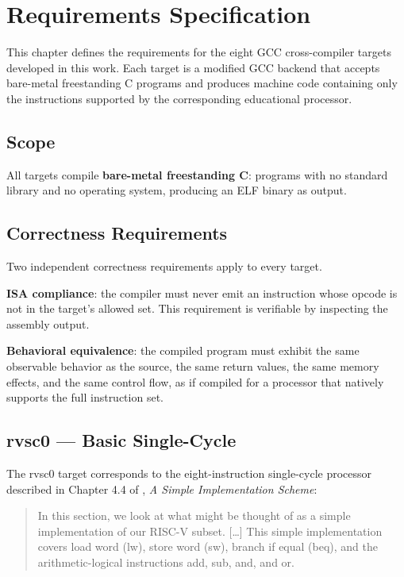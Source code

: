 \chapter{Requirements Specification} \label{cap:requirements}

This chapter defines the requirements for the eight GCC cross-compiler targets developed in this work.
Each target is a modified GCC backend that accepts bare-metal freestanding C programs and produces
machine code containing only the instructions supported by the corresponding educational processor.

\section{Scope}

All targets compile \textbf{bare-metal freestanding C}: programs with no standard library and no
operating system, producing an ELF binary as output.

\section{Correctness Requirements}

Two independent correctness requirements apply to every target.

\textbf{ISA compliance}: the compiler must never emit an instruction whose opcode is not in the
target's allowed set. This requirement is verifiable by inspecting the assembly output.

\textbf{Behavioral equivalence}: the compiled program must exhibit the same observable behavior as
the source, the same return values, the same memory effects, and the same control flow, as if
compiled for a processor that natively supports the full instruction set.

\section{rvsc0 --- Basic Single-Cycle}

The rvsc0 target corresponds to the eight-instruction single-cycle processor described in Chapter 4.4
of \cite{patterson2020}, \textit{A Simple Implementation Scheme}:

\begin{quote}
In this section, we look at what might be thought of as a simple implementation of our RISC-V subset.
[\ldots] This simple implementation covers load word (lw), store word (sw), branch if equal (beq),
and the arithmetic-logical instructions add, sub, and, and or.
\end{quote}

